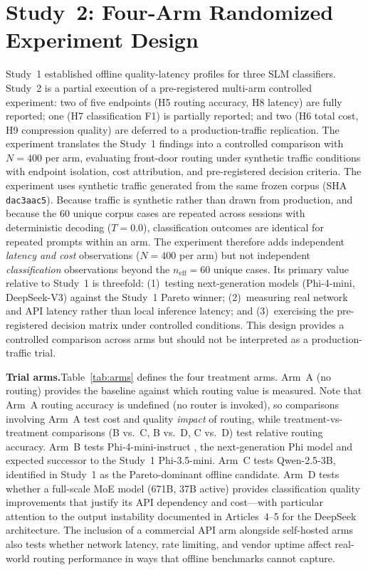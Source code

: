 \documentclass{article}
\begin{document}
\section{Study~2: Four-Arm Randomized Experiment Design}
\label{sec:rct-design}

Study~1 established offline quality-latency profiles for three SLM classifiers. Study~2 is a partial execution of a pre-registered multi-arm controlled experiment: two of five endpoints (H5 routing accuracy, H8 latency) are fully reported; one (H7 classification F1) is partially reported; and two (H6 total cost, H9 compression quality) are deferred to a production-traffic replication. The experiment translates the Study~1 findings into a controlled comparison with $N = 400$ per arm, evaluating front-door routing under synthetic traffic conditions with endpoint isolation, cost attribution, and pre-registered decision criteria. The experiment uses synthetic traffic generated from the same frozen corpus (SHA \texttt{dac3aac5}). Because traffic is synthetic rather than drawn from production, and because the 60 unique corpus cases are repeated across sessions with deterministic decoding ($T = 0.0$), classification outcomes are identical for repeated prompts within an arm. The experiment therefore adds independent \emph{latency and cost} observations ($N = 400$ per arm) but not independent \emph{classification} observations beyond the $n_{\text{eff}} = 60$ unique cases. Its primary value relative to Study~1 is threefold: (1)~testing next-generation models (Phi-4-mini, DeepSeek-V3) against the Study~1 Pareto winner; (2)~measuring real network and API latency rather than local inference latency; and (3)~exercising the pre-registered decision matrix under controlled conditions. This design provides a controlled comparison across arms but should not be interpreted as a production-traffic trial.

\textbf{Trial arms.}\quad Table~\ref{tab:arms} defines the four treatment arms. Arm~A (no routing) provides the baseline against which routing value is measured. Note that Arm~A routing accuracy is undefined (no router is invoked), so comparisons involving Arm~A test cost and quality \emph{impact} of routing, while treatment-vs-treatment comparisons (B vs.\ C, B vs.\ D, C vs.\ D) test relative routing accuracy. Arm~B tests Phi-4-mini-instruct \citep{abdin2024phi4}, the next-generation Phi model and expected successor to the Study~1 Phi-3.5-mini. Arm~C tests Qwen-2.5-3B, identified in Study~1 as the Pareto-dominant offline candidate. Arm~D tests whether a full-scale MoE model (671B, 37B active) provides classification quality improvements that justify its API dependency and cost---with particular attention to the output instability documented in Articles~4--5 for the DeepSeek architecture. The inclusion of a commercial API arm alongside self-hosted arms also tests whether network latency, rate limiting, and vendor uptime affect real-world routing performance in ways that offline benchmarks cannot capture.
\end{document}
